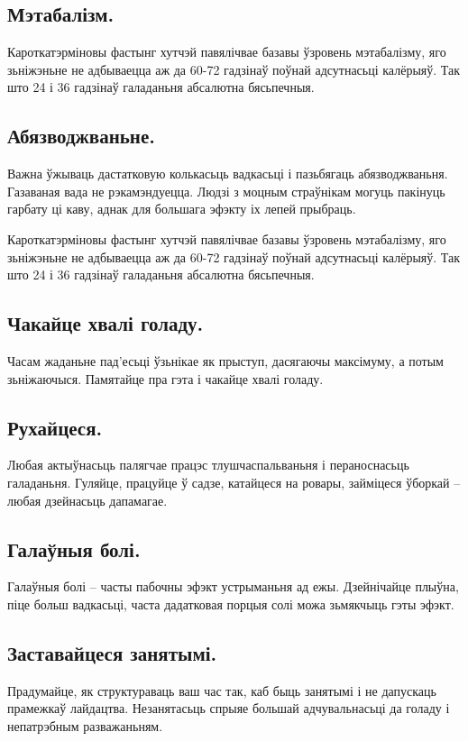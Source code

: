 \subsection{Мэтабалізм.}
Кароткатэрміновы фастынг хутчэй павялічвае базавы ўзровень мэтабалізму, яго зьніжэньне не адбываецца аж да 60-72 гадзінаў поўнай адсутнасьці калёрыяў. Так што 24 і 36 гадзінаў галаданьня абсалютна бясьпечныя.

\subsection{Абязводжваньне.}
Важна ўжываць дастатковую колькасьць вадкасьці і пазьбягаць абязводжваньня. Газаваная вада не рэкамэндуецца. Людзі з моцным страўнікам могуць пакінуць гарбату ці каву, аднак для большага эфэкту іх лепей прыбраць.

Кароткатэрміновы фастынг хутчэй павялічвае базавы ўзровень мэтабалізму, яго зьніжэньне не адбываецца аж да 60-72 гадзінаў поўнай адсутнасьці калёрыяў. Так што 24 і 36 гадзінаў галаданьня абсалютна бясьпечныя.

\subsection{Чакайце хвалі голаду.}
Часам жаданьне пад'есьці ўзьнікае як прыступ, дасягаючы максімуму, а потым зьніжаючыся. Памятайце пра гэта і чакайце хвалі голаду.

\subsection{Рухайцеся.}
Любая актыўнасьць палягчае працэс тлушчаспальваньня і пераноснасьць галаданьня. Гуляйце, працуйце ў садзе, катайцеся на ровары, займіцеся ўборкай – любая дзейнасьць дапамагае.

\subsection{Галаўныя болі.}
Галаўныя болі – часты пабочны эфэкт устрыманьня ад ежы. Дзейнічайце плыўна, піце больш вадкасьці, часта дадатковая порцыя солі можа зьмякчыць гэты эфэкт.

\subsection{Заставайцеся занятымі.}
Прадумайце, як структураваць ваш час так, каб быць занятымі і не дапускаць прамежкаў лайдацтва. Незанятасьць спрыяе большай адчувальнасьці да голаду і непатрэбным разважаньням.

